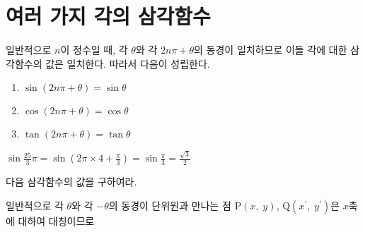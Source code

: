 \documentclass[11pt, a4paper]{book}
\begin{document}
\section{여러 가지 각의 삼각함수}

일반적으로 $n$이 정수일 때, 각 $\theta$와 각 $2n\pi +\theta$의 동경이 일치하므로 이들 각에 대한 삼각함수의 값은 일치한다. 따라서 다음이 성립한다.
\vspace{1em}
\begin{theorem}
	\begin{enumerate}[label=(\arabic*)]
		\item $\sin (2n\pi +\theta) =\sin\theta$
		\item $\cos(2n\pi + \theta)=\cos\theta$
		\item $\tan(2n\pi +\theta) = \tan\theta$
	\end{enumerate}
\end{theorem}

\begin{sample}
	$\sin \frac{25}{3}\pi =\sin \left(2\pi \times 4 +\frac{\pi}{3}\right) = \sin \frac{\pi}{3}=\frac{\sqrt{3}}{2}$
	
\end{sample}
\vspace{1em}
\begin{problem}
	다음 삼각함수의 값을 구하여라.
\end{problem}

일반적으로 각 $\theta$와 각 $-\theta$의 동경이 단위원과 만나는 점 $\textrm{P}(x, \;y)$, $\textrm{Q}(x^{\prime}, \;y^{\prime})$은 $x$축에 대하여 대칭이므로
\end{document}
